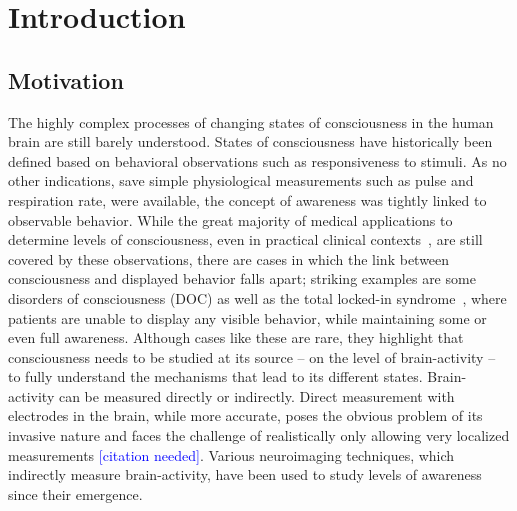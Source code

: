 \chapter{Introduction}\label{ch:introduction}




\section{Motivation}\label{sec:motivation}
The highly complex processes of changing states of consciousness in the human brain are still barely understood.
States of consciousness have historically been defined based on behavioral observations such as responsiveness to
stimuli.
As no other indications, save simple physiological measurements such as pulse and respiration rate,
were available, the concept of awareness was tightly linked to observable behavior.
While the great majority of medical applications to determine levels of consciousness,
even in practical clinical contexts~\cite{jain_glasgow_2022},
are still covered by these observations,
there are cases in which the link between consciousness and displayed behavior falls apart;
striking examples are some disorders of consciousness (DOC) as well as the total locked-in
syndrome~\cite{bauer_varieties_1979},
where patients are unable to display any visible behavior,
while maintaining some or even full awareness.
Although cases like these are rare, they highlight that consciousness needs to be studied at its source -- on the
level of brain-activity -- to fully understand the mechanisms that lead to its different states.
%
%
Brain-activity can be measured directly or indirectly.
Direct measurement with electrodes in the brain, while more accurate,
poses the obvious problem of its invasive nature and faces the challenge of realistically only allowing very
localized measurements \textcolor{blue}{[citation needed]}.
Various neuroimaging techniques, which indirectly measure brain-activity, have been used to study levels of
awareness since their emergence.
